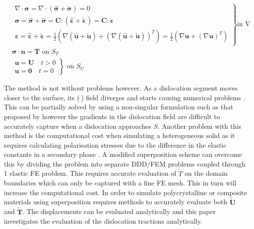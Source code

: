 \documentclass[11pt]{iopart}
\begin{document}
%
\begin{align}
     & \left.
    \begin{array}{l}
        \nabla\cdot\bm{\sigma}=\nabla\cdot\left(\bm{\hat{\sigma}} +\bm{\tilde{\sigma}}\right) = 0                                                         \\
        \bm{\sigma} =\bm{\hat{\sigma}}+\bm{\tilde{\sigma}}= \bm{C}:\left(\hat{\bm{\varepsilon}}+\tilde{\bm{\varepsilon}}\right)=\bm{C}:{\bm{\varepsilon}} \\
        \bm{\varepsilon}=\hat{\bm{\varepsilon}}+\tilde{\bm{\varepsilon}}=\frac{1}{2}\left(\nabla(\hat{\bm{u}}+\tilde{\bm{u}})+\left(\nabla(\hat{\bm{u}}+\tilde{\bm{u}})\right)^T\right) =\frac{1}{2}\left(\nabla\bm{u}+(\nabla\bm{u})^{T}\right)
    \end{array}
    \right\}\textrm{in V}                                 \\
     & \bm{\sigma}\cdot\bm{n} = \bm{T}  \textrm{ on } S_T \\
     & \left.
    \begin{array}{l}
        \bm{u} = \bm{U} \quad t>0 \\
        \bm{u} = \bm{0} \quad t=0
    \end{array}
    \right\} \textrm{ on } S_U
    \label{eq:ubc}
\end{align}

The method is not without problems however. As a dislocation segment moves closer to the surface, its ($\tilde{~}$) field diverges and starts causing numerical problems \cite{boundary_problems_in_dd}. This can be partially solved by using a non-singular formulation such as that proposed by \citet{Cai2006} however the gradients in the dislocation field are difficult to accurately capture when a dislocation approaches $S$. Another problem with this method is the computational cost when simulating a heterogeneous solid as it requires calculating polarisation stresses due to the difference in the elastic constants in a secondary phase \cite{superposition_scheme0,boundary_problems_in_dd,ddd_precipitate}. A modified superposition scheme \cite{ODay2004} can overcome this by dividing the problem into separate DDD/FEM problems coupled through 1 elastic FE problem. This requires accurate evaluation of $\tilde{T}$ on the domain boundaries which can only be captured with a fine FE mesh. This in turn will increase the computational cost. In order to simulate polycrystalline or composite materials using superposition requires methods to accurately evaluate both $\tilde{\bm{U}}$ and $\tilde{\bm{T}}$. The displacements can be evaluated analytically \cite{ddd_disp} and this paper investigates the evaluation of the dislocation tractions analytically.
\end{document}
